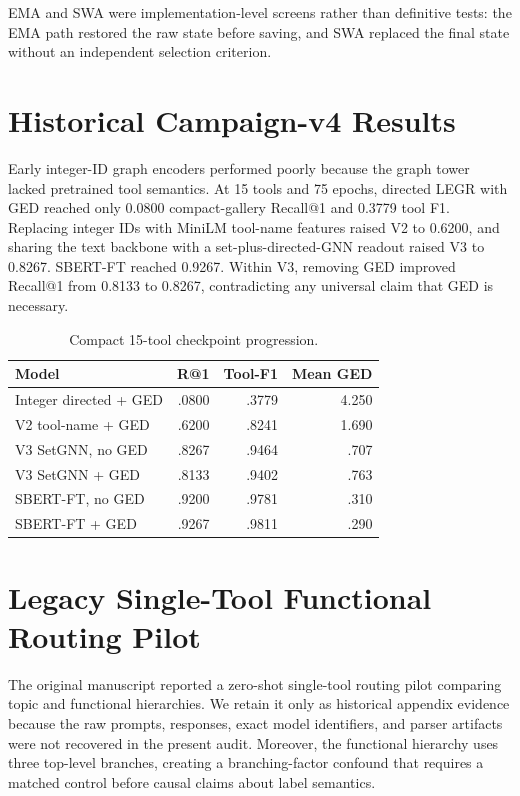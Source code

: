 \documentclass{article}
\begin{document}
EMA and SWA were implementation-level screens rather than definitive tests: the EMA path restored the raw state before saving, and SWA replaced the final state without an independent selection criterion.

\section{Historical Campaign-v4 Results}

Early integer-ID graph encoders performed poorly because the graph tower lacked pretrained tool semantics.
At 15 tools and 75 epochs, directed LEGR with GED reached only 0.0800 compact-gallery Recall@1 and 0.3779 tool F1.
Replacing integer IDs with MiniLM tool-name features raised V2 to 0.6200, and sharing the text backbone with a set-plus-directed-GNN readout raised V3 to 0.8267.
SBERT-FT reached 0.9267.
Within V3, removing GED improved Recall@1 from 0.8133 to 0.8267, contradicting any universal claim that GED is necessary.

\begin{table}[h]
\caption{Compact 15-tool checkpoint progression.}
\centering
\small
\begin{tabular}{lrrr}
\toprule
Model & R@1 & Tool-F1 & Mean GED \\
\midrule
Integer directed + GED & .0800 & .3779 & 4.250 \\
V2 tool-name + GED & .6200 & .8241 & 1.690 \\
V3 SetGNN, no GED & .8267 & .9464 & .707 \\
V3 SetGNN + GED & .8133 & .9402 & .763 \\
SBERT-FT, no GED & .9200 & .9781 & .310 \\
SBERT-FT + GED & .9267 & .9811 & .290 \\
\bottomrule
\end{tabular}
\end{table}

\section{Legacy Single-Tool Functional Routing Pilot}

The original manuscript reported a zero-shot single-tool routing pilot comparing topic and functional hierarchies.
We retain it only as historical appendix evidence because the raw prompts, responses, exact model identifiers, and parser artifacts were not recovered in the present audit.
Moreover, the functional hierarchy uses three top-level branches, creating a branching-factor confound that requires a matched control before causal claims about label semantics.
\end{document}

